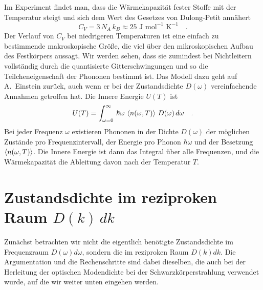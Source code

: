 Im Experiment findet man, dass die Wärmekapazität fester Stoffe mit der Temperatur steigt und sich dem Wert des Gesetzes von Dulong-Petit annähert
\begin{equation}
 C_V = 3 \, N_A \, k_B \approx 25 \text{~J} \text{~mol}^{-1} \text{~K}^{-1} \quad .
\end{equation}
Der Verlauf von $ C_V$ bei niedrigeren Temperaturen ist eine einfach zu bestimmende makroskopische Größe, die viel über den mikroskopischen Aufbau des Festkörpers aussagt. Wir werden sehen, dass sie zumindest bei Nichtleitern vollständig durch die quantisierte  Gitterschwingungen und so die Teilcheneigenschaft der Phononen bestimmt ist. Das Modell dazu geht auf A.~Einstein zurück, auch wenn er bei der Zustandsdichte $D(\omega)$ vereinfachende Annahmen getroffen hat. Die Innere Energie $U(T)$ ist
\begin{equation}
U(T) = \int_{\omega=0}^{\infty} \, \hbar \omega \, \braket{ n (\omega, T) } \, D(\omega) \, d\omega \label{eq:wk_u_allg} \quad .
\end{equation}
Bei jeder Frequenz $\omega$ existieren Phononen in der Dichte $D(\omega)$ der möglichen Zustände pro Frequenzintervall, der Energie pro Phonon $\hbar \omega$ und der Besetzung $\braket{ n (\omega, T) } $. Die Innere Energie ist dann das Integral über alle Frequenzen, und die Wärmekapazität die Ableitung davon nach der Temperatur $T$.


\section{Zustandsdichte im reziproken Raum $D(k) \, dk$ }

Zunächst betrachten wir nicht die eigentlich benötigte Zustandsdichte im Frequenzraum $D(\omega) d\omega$, sondern die im reziproken Raum $D(k) dk$. Die Argumentation und die Rechenschritte sind dabei dieselben, die auch bei der Herleitung der optischen Modendichte bei der Schwarzkörperstrahlung verwendet wurde, auf die wir weiter unten eingehen werden.

